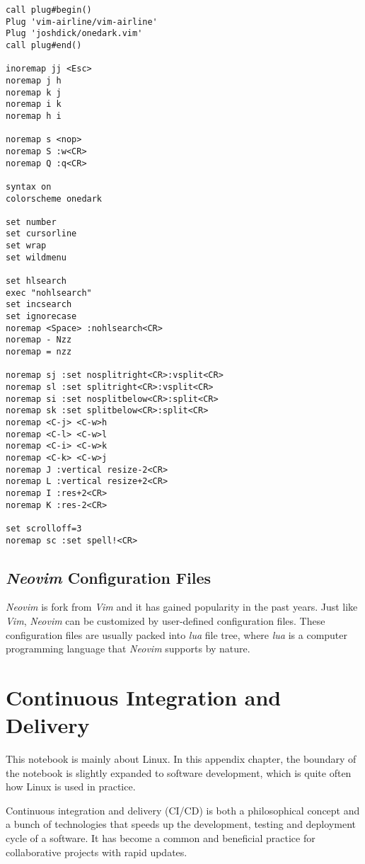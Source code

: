 \begin{lstlisting}
call plug#begin()
Plug 'vim-airline/vim-airline'
Plug 'joshdick/onedark.vim'
call plug#end()

inoremap jj <Esc>
noremap j h
noremap k j
noremap i k
noremap h i

noremap s <nop>
noremap S :w<CR>
noremap Q :q<CR>

syntax on
colorscheme onedark

set number
set cursorline
set wrap
set wildmenu

set hlsearch
exec "nohlsearch"
set incsearch
set ignorecase
noremap <Space> :nohlsearch<CR>
noremap - Nzz
noremap = nzz

noremap sj :set nosplitright<CR>:vsplit<CR>
noremap sl :set splitright<CR>:vsplit<CR>
noremap si :set nosplitbelow<CR>:split<CR>
noremap sk :set splitbelow<CR>:split<CR>
noremap <C-j> <C-w>h
noremap <C-l> <C-w>l
noremap <C-i> <C-w>k
noremap <C-k> <C-w>j
noremap J :vertical resize-2<CR>
noremap L :vertical resize+2<CR>
noremap I :res+2<CR>
noremap K :res-2<CR>

set scrolloff=3
noremap sc :set spell!<CR>
\end{lstlisting}

\section{\textit{Neovim} Configuration Files}

\textit{Neovim} is fork from \textit{Vim} and it has gained popularity in the past years. Just like \textit{Vim}, \textit{Neovim} can be customized by user-defined configuration files. These configuration files are usually packed into \textit{lua} file tree, where \textit{lua} is a computer programming language that \textit{Neovim} supports by nature.

\chapter{Continuous Integration and Delivery} \label{ch:cicd}

This notebook is mainly about Linux. In this appendix chapter, the boundary of the notebook is slightly expanded to software development, which is quite often how Linux is used in practice.

Continuous integration and delivery (CI/CD) is both a philosophical concept and a bunch of technologies that speeds up the development, testing and deployment cycle of a software. It has become a common and beneficial practice for collaborative projects with rapid updates.

